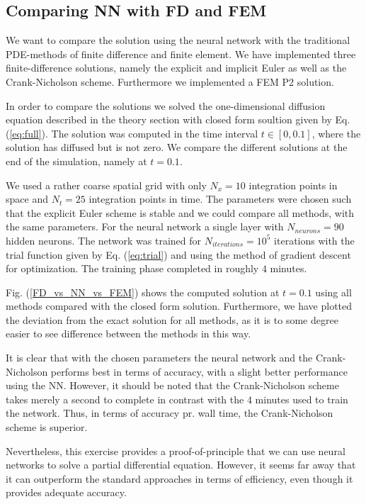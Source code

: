 \documentclass[a4paper, twocolumn]{article}
\begin{document}
\subsection{Comparing NN with FD and FEM}
We want to compare the solution using the neural network with the traditional PDE-methods of finite difference and 
finite element. We have implemented three finite-difference solutions, namely the explicit and implicit Euler as well as the  
Crank-Nicholson scheme. Furthermore we implemented a FEM P2 solution.

In order to compare the solutions we solved the one-dimensional diffusion equation described in the theory section with closed form 
soultion given by Eq. (\ref{eq:full}). The solution was computed in the time interval $t \in [0,0.1]$, where the solution has diffused but is 
not zero. We compare the different solutions at the end of the simulation, namely at $t = 0.1$.

We used a rather coarse spatial grid with only $N_x = 10$ integration points in space and 
$N_t = 25$ integration points in time. The parameters were chosen such that the explicit Euler scheme is stable and we could compare 
all methods, with the same parameters. For the neural network a single layer with $N_{neurons} = 90$ hidden neurons. The network 
was trained for $N_{iterations} = 10^5$ iterations with the trial function given by Eq. (\ref{eq:trial}) and using the method of 
gradient descent for optimization. The training phase completed in roughly $4$ minutes.

Fig. (\ref{FD_vs_NN_vs_FEM}) shows the computed solution at $t=0.1$ using all methods compared with the closed form 
solution. Furthermore, we have plotted the deviation from the exact solution for all methods, as it is to some 
degree easier to see difference between the methods in this way. 

It is clear that with the chosen parameters the neural network and the Crank-Nicholson performs best in terms of accuracy, with 
a slight better performance using the NN. However, it should be noted that the Crank-Nicholson scheme takes merely a second to complete 
in contrast with the $4$ minutes used to train the network. Thus, in terms of accuracy pr. wall time, the Crank-Nicholson scheme 
is superior.

Nevertheless, this exercise provides a proof-of-principle that we can use neural networks to solve a partial 
differential equation. However, it seems far away that it can outperform the standard approaches in terms of efficiency, 
even though it provides adequate accuracy.
\end{document}
